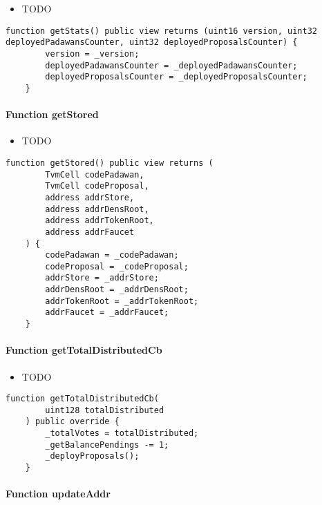 \begin{itemize}
\item TODO
\end{itemize}

\begin{lstlisting}[firstnumber=214]
    function getStats() public view returns (uint16 version, uint32 deployedPadawansCounter, uint32 deployedProposalsCounter) {
        version = _version;
        deployedPadawansCounter = _deployedPadawansCounter;
        deployedProposalsCounter = _deployedProposalsCounter;
    }
\end{lstlisting}

\paragraph{Function getStored}

\begin{itemize}
\item TODO
\end{itemize}

\begin{lstlisting}[firstnumber=198]
    function getStored() public view returns (
        TvmCell codePadawan,
        TvmCell codeProposal,
        address addrStore,
        address addrDensRoot,
        address addrTokenRoot,
        address addrFaucet
    ) {
        codePadawan = _codePadawan;
        codeProposal = _codeProposal;
        addrStore = _addrStore;
        addrDensRoot = _addrDensRoot;
        addrTokenRoot = _addrTokenRoot;
        addrFaucet = _addrFaucet;
    }
\end{lstlisting}

\paragraph{Function getTotalDistributedCb}

\begin{itemize}
\item TODO
\end{itemize}

\begin{lstlisting}[firstnumber=148]
    function getTotalDistributedCb(
        uint128 totalDistributed
    ) public override {
        _totalVotes = totalDistributed;
        _getBalancePendings -= 1;
        _deployProposals();
    }
\end{lstlisting}

\paragraph{Function updateAddr}

